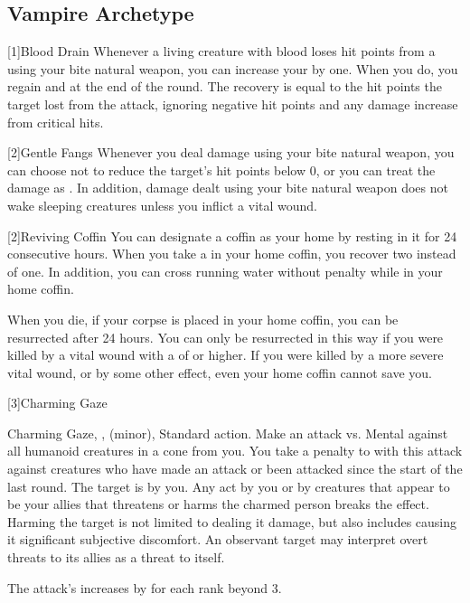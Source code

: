   \subsection{Vampire Archetype}

    [1]{Blood Drain} Whenever a living creature with blood loses hit points from a  using your bite natural weapon, you can increase your  by one.
      When you do, you regain  and  at the end of the round.
      The recovery is equal to the hit points the target lost from the attack, ignoring negative hit points and any damage increase from critical hits.

    [2]{Gentle Fangs} Whenever you deal damage using your bite natural weapon, you can choose not to reduce the target's hit points below 0, or you can treat the damage as .
      In addition, damage dealt using your bite natural weapon does not wake sleeping creatures unless you inflict a vital wound.

    [2]{Reviving Coffin} You can designate a coffin as your home by resting in it for 24 consecutive hours.
      When you take a  in your home coffin, you recover two  instead of one.
      In addition, you can cross running water without penalty while in your home coffin.

      When you die, if your corpse is placed in your home coffin, you can be resurrected after 24 hours.
      You can only be resurrected in this way if you were killed by a vital wound with a  of  or higher.
      If you were killed by a more severe vital wound, or by some other effect, even your home coffin cannot save you.

    [3]{Charming Gaze}
      \begin{magicalsustainability}{Charming Gaze}{, ,  (minor), }
        \abilityusagetime Standard action.
        \rankline
        Make an attack vs. Mental against all humanoid creatures in a \medarea cone from you.
        You take a  penalty to  with this attack against creatures who have made an attack or been attacked since the start of the last round.
        \hit The target is \charmed by you.
        Any act by you or by creatures that appear to be your allies that threatens or harms the charmed person breaks the effect.
        Harming the target is not limited to dealing it damage, but also includes causing it significant subjective discomfort.
        An observant target may interpret overt threats to its allies as a threat to itself.

        \rankline
        The attack's  increases by  for each rank beyond 3.
      \end{magicalsustainability}

